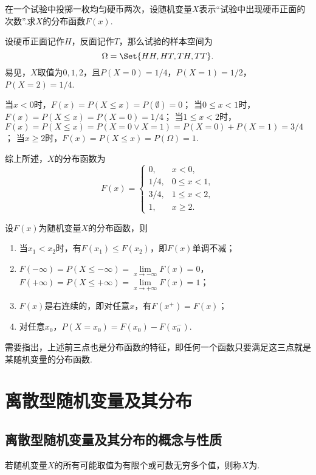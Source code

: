 \begin{example}
在一个试验中投掷一枚均匀硬币两次，设随机变量\(X\)表示“试验中出现硬币正面的次数”.求\(X\)的分布函数\(F(x)\).
\begin{solution}
设硬币正面记作\(H\)，反面记作\(T\)，那么试验的样本空间为\[
\Omega = \Set{ HH, HT, TH, TT }.
\]易见，\(X\)取值为\(0,1,2\)，且\(P(X=0) = 1/4\)，\(P(X=1) = 1/2\)，\(P(X=2) = 1/4\).

当\(x < 0\)时，\(F(x) = P(X \leqslant x) = P(\emptyset) = 0\)；
当\(0 \leqslant x < 1\)时，\(F(x) = P(X \leqslant x) = P(X=0) = 1/4\)；
当\(1 \leqslant x < 2\)时，\(F(x) = P(X \leqslant x) = P(X=0 \lor X=1) = P(X=0)+P(X=1) = 3/4\)；
当\(x \geqslant 2\)时，\(F(x) = P(X \leqslant x) = P(\Omega) = 1\).

综上所述，\(X\)的分布函数为\[
F(x) = \left\{ \begin{array}{cl}
0, & x < 0, \\
1/4, & 0 \leqslant x < 1, \\
3/4, & 1 \leqslant x < 2, \\
1, & x \geqslant 2.
\end{array} \right.
\]
\end{solution}
\end{example}

\begin{property}
设\(F(x)\)为随机变量\(X\)的分布函数，则
\begin{enumerate}
\item 当\(x_1 < x_2\)时，有\(F(x_1) \leqslant F(x_2)\)，即\(F(x)\)单调不减；
\item \(F(-\infty)=P(X \leqslant -\infty) = \lim\limits_{x \to -\infty}{F(x)} = 0\)，%
\(F(+\infty)=P(X \leqslant +\infty) = \lim\limits_{x \to +\infty}{F(x)} = 1\)；
\item \(F(x)\)是右连续的，即对任意\(x\)，有\(F(x^+)=F(x)\)；
\item 对任意\(x_0\)，\(P(X=x_0)=F(x_0)-F(x_0^-)\).
\end{enumerate}

需要指出，上述前三点也是分布函数的特征，即任何一个函数只要满足这三点就是某随机变量的分布函数.
\end{property}

\section{离散型随机变量及其分布}
\subsection{离散型随机变量及其分布的概念与性质}
\begin{definition}
若随机变量\(X\)的所有可能取值为有限个或可数无穷多个值，则称\(X\)为.
\end{definition}

